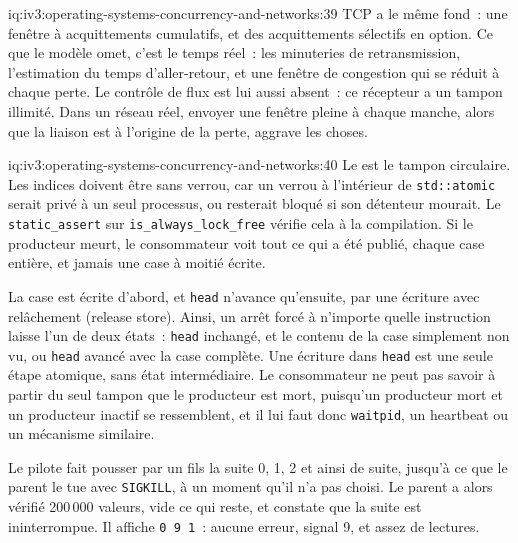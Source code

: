 \begin{solution}{iq:iv3:operating-systems-concurrency-and-networks:39}
TCP a le même fond~: une fenêtre à acquittements cumulatifs, et des acquittements sélectifs en option. Ce que le modèle omet, c'est le temps réel~: les minuteries de retransmission, l'estimation du temps d'aller-retour, et une fenêtre de congestion qui se réduit à chaque perte. Le contrôle de flux est lui aussi absent~: ce récepteur a un tampon illimité. Dans un réseau réel, envoyer une fenêtre pleine à chaque manche, alors que la liaison est à l'origine de la perte, aggrave les choses.

\end{solution}

\begin{solution}{iq:iv3:operating-systems-concurrency-and-networks:40}
Le  est le tampon circulaire. Les indices doivent être sans verrou, car un verrou à l'intérieur de \texttt{std::atomic} serait privé à un seul processus, ou resterait bloqué si son détenteur mourait. Le \texttt{static\_assert} sur \texttt{is\_always\_lock\_free} vérifie cela à la compilation. Si le producteur meurt, le consommateur voit tout ce qui a été publié, chaque case entière, et jamais une case à moitié écrite.
\label{lst:iv3:os:shmring}

La case est écrite d'abord, et \texttt{head} n'avance qu'ensuite, par une écriture avec relâchement (release store). Ainsi, un arrêt forcé à n'importe quelle instruction laisse l'un de deux états~: \texttt{head} inchangé, et le contenu de la case simplement non vu, ou \texttt{head} avancé avec la case complète. Une écriture dans \texttt{head} est une seule étape atomique, sans état intermédiaire. Le consommateur ne peut pas savoir à partir du seul tampon que le producteur est mort, puisqu'un producteur mort et un producteur inactif se ressemblent, et il lui faut donc \texttt{waitpid}, un heartbeat ou un mécanisme similaire.

Le pilote fait pousser par un fils la suite 0, 1, 2 et ainsi de suite, jusqu'à ce que le parent le tue avec \texttt{SIGKILL}, à un moment qu'il n'a pas choisi. Le parent a alors vérifié 200\,000 valeurs, vide ce qui reste, et constate que la suite est ininterrompue. Il affiche \texttt{0 9 1}~: aucune erreur, signal 9, et assez de lectures.


\end{solution}
